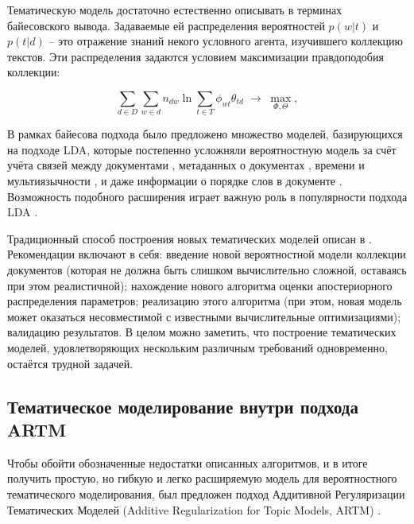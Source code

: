 Тематическую модель достаточно естественно описывать в терминах байесовского вывода.  Задаваемые ей распределения вероятностей $p(w|t)$ и $p(t|d)$ – это отражение знаний некого условного агента, изучившего коллекцию текстов. Эти распределения задаются условием максимизации правдоподобия коллекции:

\begin{equation}
\label{eq:logL}
    \sum_{d\in D} \sum_{w\in d} n_{dw} \ln
        \sum_{t\in T}
            \phi_{wt}\theta_{td}
    \;\to\; \max_{\Phi,\Theta},
\end{equation}


В рамках байесова подхода было предложено множество моделей, базирующихся на подходе LDA, которые постепенно усложняли вероятностную модель за счёт учёта связей между документами \cite{cohn2001missing,mccallum2005author,nallapati2008link}, метаданных о документах \cite{steyvers2004probabilistic}, 
времени и мультиязычности \cite{zosa-granroth-wilding-2019-multilingual}, и даже информации о порядке слов в документе \cite{gruber2007hidden,wallach2006topic}. Возможность подобного расширения играет важную роль в популярности подхода LDA \cite{fntir2017applications}.

Традиционный способ построения новых тематических моделей описан в  \cite{fntir2017applications}. Рекомендации включают в себя: введение новой вероятностной модели коллекции документов (которая не должна быть слишком вычислительно сложной, оставаясь при этом реалистичной); нахождение нового алгоритма оценки апостериорного распределения параметров; реализацию этого алгоритма (при этом, новая модель может оказаться несовместимой с известными вычислительные оптимизациями); валидацию результатов. В целом можно заметить, что построение тематических моделей, удовлетворяющих нескольким различным требований одновременно, остаётся трудной задачей.

\subsection{Тематическое моделирование внутри подхода ARTM}

Чтобы обойти обозначенные недостатки описанных алгоритмов, и в итоге получить простую, но гибкую и легко расширяемую модель для вероятностного тематического моделирования, был предложен подход Аддитивной Регуляризации Тематических Моделей (Additive Regularization for Topic Models, ARTM) \cite{vorontsov2014additive,vorontsov2014tutorial,vorontsov2015additive}. 

